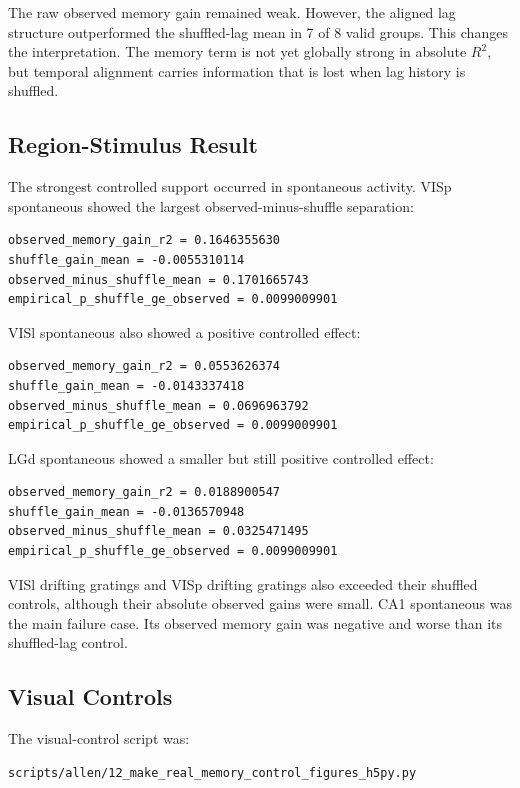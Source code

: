 The raw observed memory gain remained weak. However, the aligned lag structure outperformed the shuffled-lag mean in 7 of 8 valid groups. This changes the interpretation. The memory term is not yet globally strong in absolute \(R^2\), but temporal alignment carries information that is lost when lag history is shuffled.

\subsection{Region-Stimulus Result}

The strongest controlled support occurred in spontaneous activity. VISp spontaneous showed the largest observed-minus-shuffle separation:

\begin{verbatim}
observed_memory_gain_r2 = 0.1646355630
shuffle_gain_mean = -0.0055310114
observed_minus_shuffle_mean = 0.1701665743
empirical_p_shuffle_ge_observed = 0.0099009901
\end{verbatim}

VISl spontaneous also showed a positive controlled effect:

\begin{verbatim}
observed_memory_gain_r2 = 0.0553626374
shuffle_gain_mean = -0.0143337418
observed_minus_shuffle_mean = 0.0696963792
empirical_p_shuffle_ge_observed = 0.0099009901
\end{verbatim}

LGd spontaneous showed a smaller but still positive controlled effect:

\begin{verbatim}
observed_memory_gain_r2 = 0.0188900547
shuffle_gain_mean = -0.0136570948
observed_minus_shuffle_mean = 0.0325471495
empirical_p_shuffle_ge_observed = 0.0099009901
\end{verbatim}

VISl drifting gratings and VISp drifting gratings also exceeded their shuffled controls, although their absolute observed gains were small. CA1 spontaneous was the main failure case. Its observed memory gain was negative and worse than its shuffled-lag control.

\subsection{Visual Controls}

The visual-control script was:

\begin{verbatim}
scripts/allen/12_make_real_memory_control_figures_h5py.py
\end{verbatim}

